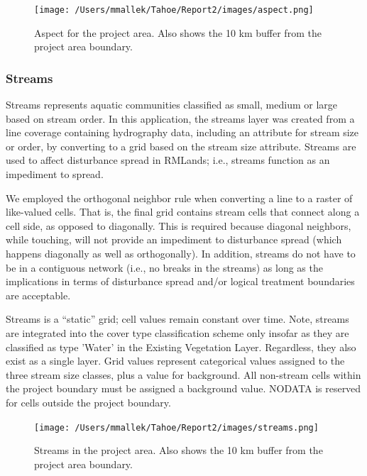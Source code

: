 \begin{figure}[htbp]
\centering
\texttt{[image: /Users/mmallek/Tahoe/Report2/images/aspect.png]}
\caption{Aspect for the project area. Also shows the 10 km buffer from the project area boundary.} 
\label{aspectmap}
\end{figure}

\subsubsection{Streams} 
Streams represents aquatic communities classified as small, medium or large based on
stream order. In this application, the streams layer was created from a line coverage containing hydrography data, including an attribute for stream size or order, by converting to a grid based on the stream size attribute. Streams are used to affect disturbance spread in RMLands; i.e., streams function as an impediment to spread. 

We employed the orthogonal neighbor rule when converting a line to a raster of like-valued cells. That is, the final grid contains stream cells that connect along a cell side, as opposed to diagonally. This is required because diagonal neighbors, while touching, will not provide an impediment to disturbance spread (which happens diagonally as well as orthogonally). In addition, streams do not have to be in a contiguous network (i.e., no breaks in the streams) as long as the implications in terms of disturbance spread and/or logical treatment boundaries are acceptable. 

Streams is a ``static'' grid; cell values remain constant over time. Note, streams are integrated into the cover type classification scheme only insofar as they are classified as type 'Water' in the Existing Vegetation Layer. Regardless, they also exist as a single layer. Grid values represent categorical values assigned to the three stream size classes, plus a value for background. All non-stream cells within the project boundary must be assigned a background value. NODATA is reserved for cells outside the project boundary. 

\begin{figure}[htbp]
\centering
\texttt{[image: /Users/mmallek/Tahoe/Report2/images/streams.png]}
\caption{Streams in the project area. Also shows the 10 km buffer from the project area boundary.} 
\label{streamsmap}
\end{figure}

